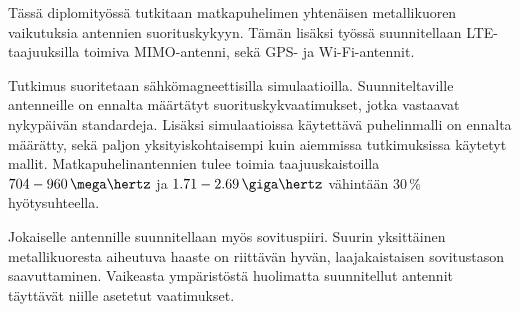

Tässä diplomityössä tutkitaan matkapuhelimen yhtenäisen metallikuoren vaikutuksia antennien suorituskykyyn. Tämän lisäksi työssä suunnitellaan LTE-taajuuksilla toimiva MIMO-antenni, sekä GPS- ja Wi-Fi-antennit.

Tutkimus suoritetaan sähkömagneettisilla simulaatioilla. Suunniteltaville antenneille on ennalta määrtätyt suorituskykvaatimukset, jotka vastaavat nykypäivän standardeja. Lisäksi simulaatioissa käytettävä puhelinmalli on ennalta määrätty, sekä paljon yksityiskohtaisempi kuin aiemmissa tutkimuksissa käytetyt mallit. Matkapuhelinantennien tulee toimia taajuuskaistoilla $704-960\,\mega\hertz$ ja $1.71-2.69\,\giga\hertz$ vähintään 30\,\% hyötysuhteella.

Jokaiselle antennille suunnitellaan myös sovituspiiri. Suurin yksittäinen metallikuoresta aiheutuva haaste on riittävän hyvän, laajakaistaisen sovitustason saavuttaminen. Vaikeasta ympäristöstä huolimatta suunnitellut antennit täyttävät niille asetetut vaatimukset.